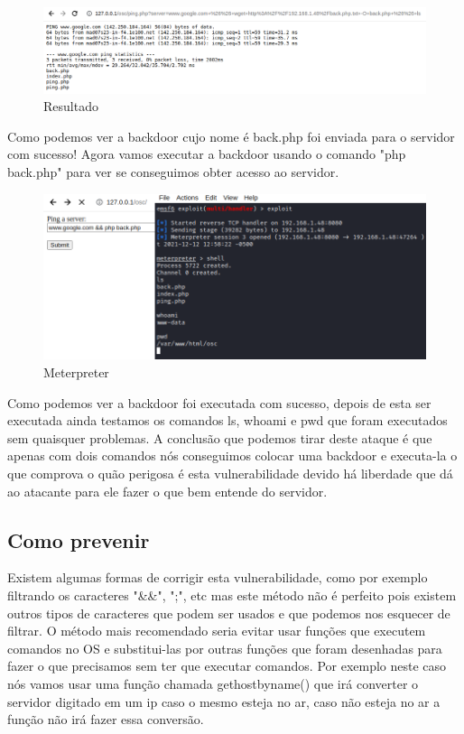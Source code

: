 \documentclass{report}
\begin{document}
\begin{figure}[h]
 \centering
 \includegraphics[scale=0.3]{imagessql/Fig22.png}
 \caption{Resultado}\label{resultado}
\end{figure}
Como podemos ver a backdoor cujo nome é back.php foi enviada para o servidor com sucesso! Agora vamos executar a backdoor usando o comando "php back.php" para ver se conseguimos obter acesso ao servidor.
\clearpage
\begin{figure}[h]
 \centering
 \includegraphics[scale=0.4]{imagessql/Fig23.png}
 \caption{Meterpreter}\label{meterpreter}
\end{figure}

Como podemos ver a backdoor foi executada com sucesso, depois de esta ser executada ainda testamos os comandos ls, whoami e pwd que foram executados sem quaisquer problemas. A conclusão que podemos tirar deste ataque é que apenas com dois comandos nós conseguimos colocar uma backdoor e executa-la o que comprova o quão perigosa é esta vulnerabilidade devido há liberdade que dá ao atacante para ele fazer o que bem entende do servidor.

\clearpage
\subsection{Como prevenir}

Existem algumas formas de corrigir esta vulnerabilidade, como por exemplo filtrando os caracteres "&&", ";", etc mas este método não é perfeito pois existem outros tipos de caracteres que podem ser usados e que podemos nos esquecer de filtrar. O método mais recomendado seria evitar usar funções que executem comandos no OS e substitui-las por outras funções que foram desenhadas para fazer o que precisamos sem ter que executar comandos. Por exemplo neste caso nós vamos usar uma função chamada gethostbyname() que irá converter o servidor digitado em um ip caso o mesmo esteja no ar, caso não esteja no ar a função não irá fazer essa conversão.
\end{document}
